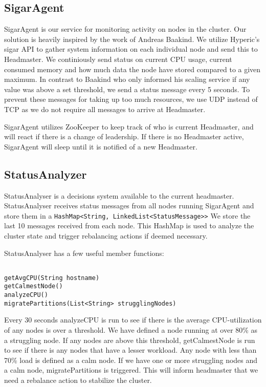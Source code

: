 \subsection{SigarAgent}
SigarAgent is our service for monitoring activity on nodes in the cluster. Our solution is heavily inspired by the work of Andreas Baakind\cite{baakind}. We utilize Hyperic's sigar API to gather system information on each individual node and send this to Headmaster. We continiously send status on current CPU usage, current consumed memory and how much data the node have stored compared to a given maximum. In contrast to Baakind who only informed his scaling service if any value was above a set threshold, we send a status message every 5 seconds. To prevent these messages for taking up too much resources, we use UDP instead of TCP as we do not require all messages to arrive at Headmaster. 

SigarAgent utilizes ZooKeeper to keep track of who is current Headmaster, and will react if there is a change of leadership. If there is no Headmaster active, SigarAgent will sleep until it is notified of a new Headmaster. 

\subsection{StatusAnalyzer}
StatusAnalyser is a decisions system available to the current headmaster. StatusAnalyser receives status messages from all nodes running SigarAgent and store them in a \texttt{HashMap<String, LinkedList<StatusMessage>>} We store the last 10 messages received from each node. This HashMap is used to analyze the cluster state and trigger rebalancing actions if deemed necessary.

StatusAnalyser has a few useful member functions:

\begin{lstlisting}[style=customjava,label=lst:test,caption={a caption}]

getAvgCPU(String hostname)
getCalmestNode()
analyzeCPU()
migratePartitions(List<String> strugglingNodes)

\end{lstlisting}

Every 30 seconds analyzeCPU is run to see if there is the average CPU-utilization of any nodes is over a threshold. We have defined a node running at over 80\% as a struggling node. If any nodes are above this threshold, getCalmestNode is run to see if there is any nodes that have a lesser workload. Any node with less than 70\% load is defined as a calm node. If we have one or more struggling nodes and a calm node, migratePartitions is triggered. This will inform headmaster that we need a rebalance action to stabilize the cluster. 

